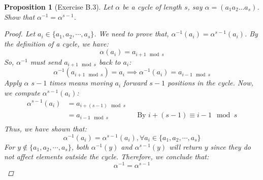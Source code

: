 \documentclass[12pt]{article}
\newtheorem{proposition}{Proposition}
\begin{document}
\begin{proposition}[Exercise B.3]
  Let $\alpha$ be a cycle of length $s$, say $\alpha = (a_1 a_2 \ldots a_s)$.
  Show that $\alpha^{-1} = \alpha^{s-1}$.
  \begin{proof}
    Let $a_i \in \{a_1, a_2, \cdots , a_s\}$.
    We need to prove that, $\alpha^{-1}(a_i) = \alpha^{s-1}(a_i)$.
    By the definition of a cycle, we have:
    \[
      \alpha(a_i) = a_{i + 1 \mod s}
    \]
    So, $\alpha^{-1}$ must send $a_{i + 1 \mod s}$ back to $a_i$:
    \[
      \alpha^{-1}(a_{i + 1 \mod s}) = a_i \implies \alpha^{-1}(a_i) = a_{i - 1 \mod s}
    \]
    Apply $\alpha$ $s - 1$ times means moving $a_i$ forward $s - 1$ positions in the cycle.
    Now, we compute $\alpha^{s-1}(a_i)$:
    \begin{align*}
      \alpha^{s-1}(a_i) & = a_{i + (s - 1) \mod s} &  &                                            \\
                        & = a_{i - 1 \mod s}       &  & \text{By } i + (s - 1) \equiv i - 1 \mod s \\
    \end{align*}
    Thus, we have shown that:
    \[
      \alpha^{-1}(a_i) = \alpha^{s-1}(a_i), \forall a_i \in \{a_1, a_2, \cdots , a_s\}
    \]
    For $y \notin \{a_1, a_2, \cdots, a_s\}$, both $\alpha^{-1}(y)$ and $\alpha^{s-1}(y)$ will return $y$ since they do not affect elements outside the cycle.
    Therefore, we conclude that:
    \[
      \alpha^{-1} = \alpha^{s-1}
    \]
  \end{proof}
\end{proposition}


\end{document}
